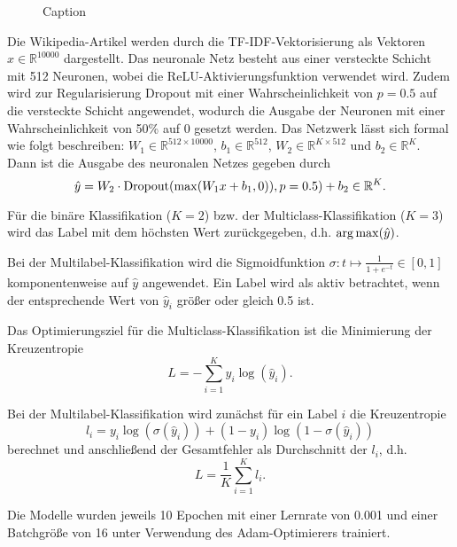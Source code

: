 \begin{figure}[H]
    \centering
    
    \caption{Caption}
\end{figure}
Die Wikipedia-Artikel werden durch die TF-IDF-Vektorisierung als Vektoren $x\in\mathbb{R}^{10000}$ dargestellt. Das neuronale Netz besteht aus einer versteckte Schicht mit 512 Neuronen, wobei die ReLU-Aktivierungsfunktion verwendet wird. Zudem wird zur Regularisierung Dropout mit einer Wahrscheinlichkeit von $p=0.5$ auf die versteckte Schicht angewendet, wodurch die Ausgabe der Neuronen mit einer Wahrscheinlichkeit von 50\% auf 0 gesetzt werden. Das Netzwerk lässt sich formal wie folgt beschreiben: $W_1\in\mathbb{R}^{512\times 10000}$, $b_1\in\mathbb{R}^{512}$, $W_2\in\mathbb{R}^{K\times 512}$ und $b_2\in\mathbb{R}^{K}$. Dann ist die Ausgabe des neuronalen Netzes gegeben durch
\begin{equation*}
    \hat{y} = W_2\cdot \operatorname*{Dropout}(\max(W_1x + b_1, 0)), p=0.5) + b_2\in\mathbb{R}^{K}.
\end{equation*}

Für die binäre Klassifikation ($K=2$) bzw. der Multiclass-Klassifikation ($K=3$) wird das Label mit dem höchsten Wert zurückgegeben, d.h. $\operatorname*{arg\,max} (\hat{y})$.

Bei der Multilabel-Klassifikation wird die Sigmoidfunktion $\sigma\colon t\mapsto \frac{1}{1 + e^{-t}}\in [0, 1]$ komponentenweise auf $\hat{y}$ angewendet. Ein Label wird als aktiv betrachtet, wenn der entsprechende Wert von $\hat{y}_i$ größer oder gleich 0.5 ist.

Das Optimierungsziel für die Multiclass-Klassifikation ist die Minimierung der Kreuzentropie
\begin{equation*}
    L = - \sum_{i=1}^{K}y_i\log(\hat{y}_i).
\end{equation*}

Bei der Multilabel-Klassifikation wird zunächst für ein Label $i$ die Kreuzentropie 
\begin{equation*}
    l_i = y_i\log (\sigma(\hat{y}_i)) + (1 - y_i)\log (1 - \sigma(\hat{y}_i))
\end{equation*}
berechnet und anschließend der Gesamtfehler als Durchschnitt der $l_i$, d.h.
\begin{equation*}
    L = \frac{1}{K}\sum_{i=1}^{K} l_i.
\end{equation*}

Die Modelle wurden jeweils 10 Epochen mit einer Lernrate von 0.001 und einer Batchgröße von 16 unter Verwendung des Adam-Optimierers trainiert.